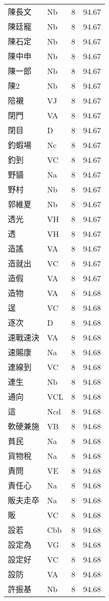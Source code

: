 \documentclass[twocolumn]{book}
\begin{document}
\begin{supertabular}{llrr}
陳長文 & Nb & 8 &  94.67\\
陳廷寵 & Nb & 8 &  94.67\\
陳石定 & Nb & 8 &  94.67\\
陳中申 & Nb & 8 &  94.67\\
陳一郎 & Nb & 8 &  94.67\\
陳2 & Nb & 8 &  94.67\\
陪襯 & VJ & 8 &  94.67\\
閉門 & VA & 8 &  94.67\\
閉目 & D & 8 &  94.67\\
釣蝦場 & Nc & 8 &  94.67\\
釣到 & VC & 8 &  94.67\\
野貓 & Na & 8 &  94.67\\
野村 & Nb & 8 &  94.67\\
郭維夏 & Nb & 8 &  94.67\\
透光 & VH & 8 &  94.67\\
透 & VH & 8 &  94.67\\
造謠 & VA & 8 &  94.67\\
造就出 & VC & 8 &  94.67\\
造假 & VA & 8 &  94.67\\
造物 & VA & 8 &  94.68\\
逞 & VC & 8 &  94.68\\
逐次 & D & 8 &  94.68\\
速戰速決 & VA & 8 &  94.68\\
速賜康 & Na & 8 &  94.68\\
連線到 & VC & 8 &  94.68\\
連生 & Nb & 8 &  94.68\\
通向 & VCL & 8 &  94.68\\
這 & Ncd & 8 &  94.68\\
軟硬兼施 & VB & 8 &  94.68\\
貧民 & Na & 8 &  94.68\\
貨物稅 & Na & 8 &  94.68\\
責問 & VE & 8 &  94.68\\
責任心 & Na & 8 &  94.68\\
販夫走卒 & Na & 8 &  94.68\\
販 & VC & 8 &  94.68\\
設若 & Cbb & 8 &  94.68\\
設定為 & VG & 8 &  94.68\\
設定好 & VC & 8 &  94.68\\
設防 & VA & 8 &  94.68\\
許振基 & Nb & 8 &  94.68\\

\end{supertabular}
\end{document}
